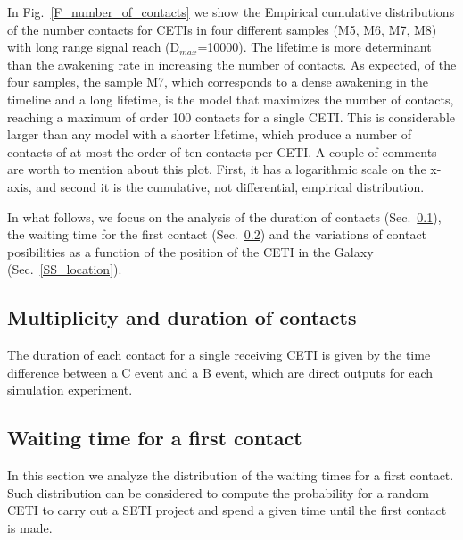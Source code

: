 \documentclass[crop]{CSLB}%
\begin{document}
In Fig.~\ref{F_number_of_contacts} we show the Empirical cumulative
distributions of the number contacts for CETIs in four different
samples (M5, M6, M7, M8) with long range signal reach
(D$_{max}$=10000). 
%
The lifetime is more determinant than the awakening rate in increasing
the number of contacts.
%
As expected, of the four samples, the sample M7, which corresponds to
a dense awakening in the timeline and a long lifetime, is the model
that maximizes the number of contacts, reaching a maximum of order 100
contacts for a single CETI.
%
This is considerable larger than any model with a shorter lifetime,
which produce a number of contacts of at most the order of ten
contacts per CETI.
%
A couple of comments are worth to mention about this plot.
%
First, it has a logarithmic scale on the x-axis, and second it is the
cumulative, not differential, empirical distribution.
 

In what follows, we focus on the analysis of the duration of contacts
(Sec.~\ref{SS_multiplicity}), the waiting time for the first contact
(Sec.~\ref{SS_waiting}) and the
variations of contact posibilities as a function of the position of
the CETI in the Galaxy (Sec.~\ref{SS_location}).


\subsection{Multiplicity and duration of contacts}\label{SS_multiplicity}

The duration of each contact for a single receiving CETI is given by the
time difference between a C event and a B event, which are direct
outputs for each simulation experiment.





\subsection{Waiting time for a first contact}\label{SS_waiting}

In this section we analyze the distribution of the waiting times for
a first contact.
%
Such distribution can be considered to compute the probability for a
random CETI to carry out a SETI project and spend a given time until
the first contact is made. 
\end{document}
